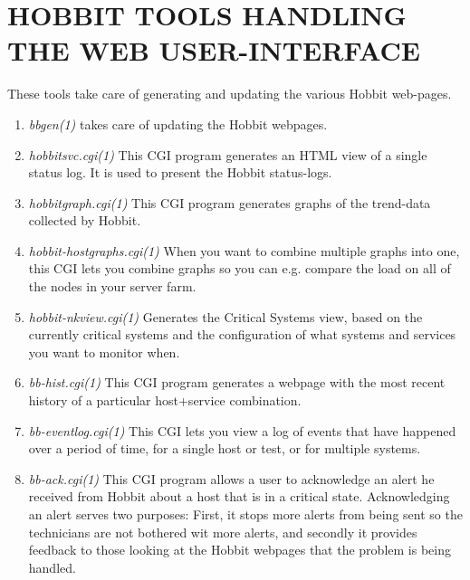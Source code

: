  
\section{HOBBIT TOOLS HANDLING THE WEB USER-INTERFACE}
 These tools take care of generating and updating the various Hobbit web-pages. 

\begin{enumerate}
 \item \emph{bbgen(1)}
 takes care of updating the Hobbit webpages. 


 \item \emph{hobbitsvc.cgi(1)}
 This CGI program generates an HTML view of a single status log. It is used to present the Hobbit status-logs. 


 \item \emph{hobbitgraph.cgi(1)}
 This CGI program generates graphs of the trend-data collected by Hobbit. 


 \item \emph{hobbit-hostgraphs.cgi(1)}
 When you want to combine multiple graphs into one, this CGI lets you
 combine graphs so you can e.g. compare the load on all of the nodes
 in your server farm. 



 \item \emph{hobbit-nkview.cgi(1)}
 Generates the Critical Systems view, based on the currently critical
 systems and the configuration of what systems and services you want
 to monitor when. 



 \item \emph{bb-hist.cgi(1)}
 This CGI program generates a webpage with the most recent history of
 a particular host+service combination. 



 \item \emph{bb-eventlog.cgi(1)}
 This CGI lets you view a log of events that have happened over a
 period of time, for a single host or test, or for multiple systems. 



 \item \emph{bb-ack.cgi(1)}
 This CGI program allows a user to acknowledge an alert he received
 from Hobbit about a host that is in a critical state. Acknowledging
 an alert serves two purposes: First, it stops more alerts from being
 sent so the technicians are not bothered wit more alerts, and
 secondly it provides feedback to those looking at the Hobbit webpages
 that the problem is being handled. 




\end{enumerate}
